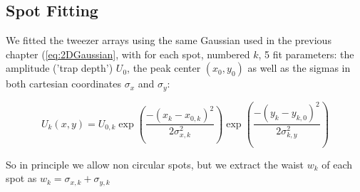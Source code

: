 \subsection{Spot Fitting}

We fitted the tweezer arrays using the same Gaussian used in the previous chapter (\cref{eq:2DGaussian}, with for each spot, numbered $k$, 5 fit parameters: the amplitude ('trap depth') $U_0$, the peak center $(x_0, y_0)$ as well as the sigmas in both cartesian coordinates $\sigma_x$ and $\sigma_y$:

\begin{equation}\label{eq:2DGaussianNumberK}
    U_k(x,y) = U_{0,k}\exp{\left(\frac{-(x_k-x_{0,k})^2}{2\sigma_{x,k}^2}\right)}
    \exp{\left( \frac{-(y_k-y_{k,0})^2}{2\sigma_{k,y}^2} \right)}
\end{equation}

So in principle we allow non circular spots, but we extract the waist $w_k$ of each spot as $w_k = \sigma_{x,k} + \sigma_{y,k}$